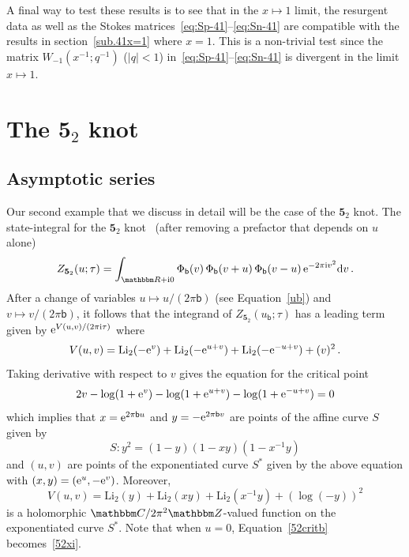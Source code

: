 \documentclass[12pt,reqno]{amsart}
\theoremstyle{definition}
\def\BZ{\mathbbm Z}
\def\BR{\mathbbm R}
\def\BC{\mathbbm C}
\def\Li{\mathrm{Li}}
\def\bb{\mathsf{b}}
\def\ri{\mathrm{i}}
\def\rd{\mathrm{d}}
\def\re{{\rm e}}
\def\ri{{\rm i}}
\def\rd{{\rm d}}
\def\ub{u_{\mathsf{b}}}
\def\md{\mathbf}
\newcommand{\knot}[1]{\md{#1}}
\begin{document}
A final way to test these results is to see that in the $x\mapsto 1$
limit, the resurgent data as well as the Stokes
matrices~\eqref{eq:Sp-41}--\eqref{eq:Sn-41} are compatible with the
results in section~\ref{sub.41x=1} where $x=1$. This is a non-trivial
test since the matrix $W_{-1}(x^{-1};q^{-1})$ ($|q|<1$)
in~\eqref{eq:Sp-41}--\eqref{eq:Sn-41} is divergent in the limit $x\mapsto 1$.


\section{The $\knot{5}_2$ knot}
\label{sec.52}

\subsection{Asymptotic series}
\label{sub.52asy}

Our second example that we discuss in detail will be the case of the
$\knot{5}_2$ knot. The state-integral for the $\knot{5}_2$
knot~\cite[Eqn.(39)]{AK} (after removing a prefactor that depends on $u$ alone) 
\begin{equation}
  \label{Z52x}
  Z_{\knot{5}_2}(u;\tau) =
  \int_{\BR+\ri 0}  \Phi_\bb(v) \, \Phi_\bb(v+u)
  \, \Phi_\bb(v-u) \, \re^{-2\pi \ri v^2} \rd v \,.
\end{equation}
After a change of variables $u \mapsto u/(2\pi \bb)$ (see
Equation~\eqref{ub}) and $v \mapsto v/(2\pi\bb)$, it follows
that the integrand of $Z_{\knot{5}_2}(\ub;\tau)$ has a leading term
given by $\re^{V(u,v)/(2 \pi \ri \tau)}$ where
\begin{equation}
  \label{V52}
  V(u,v) = \Li_2(-\re^{v}) + \Li_2(-\re^{u+v}) + \Li_2(-\re^{-u+v})
  + (v)^2 \,.
\end{equation}
Taking derivative with respect to $v$ gives the equation for the
critical point
\begin{equation}
  \label{52crit}
  2 v - \log(1+\re^{v}) -\log(1+\re^{u+v}) -\log(1+\re^{-u+v})=0
\end{equation}
which implies that $x=\re^{2\pi \bb u}$ and $y=-\re^{2\pi \bb v}$ are
points of the affine curve $S$ given by
\begin{equation}
  \label{52critb}
  S : y^2 = (1-y)(1- x y)(1-x^{-1}y) 
\end{equation}
and $(u, v)$ are points of the exponentiated curve $S^*$ given
by the above equation with $(x,y)=(\re^{u},-\re^{v})$.
Moreover, 
\begin{equation}
  \label{V52b}
  V(u,v) = \Li_2(y)+\Li_2(xy) +\Li_2(x^{-1}y) + (\log (-y))^2 
\end{equation}
is a holomorphic $\BC/2\pi^2\BZ$-valued function on the exponentiated
curve $S^*$. Note that when $u=0$, Equation~\eqref{52critb}
becomes~\eqref{52xi}.
\end{document}
